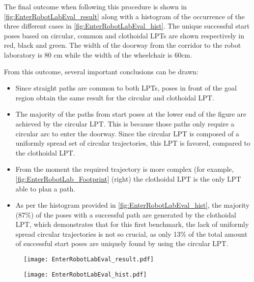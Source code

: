 \vspace{1em}

The final outcome when following this procedure is shown in \cref{fig:EnterRobotLabEval_result} along with a histogram of the occurrence of the three different cases in \cref{fig:EnterRobotLabEval_hist}. The unique successful start poses based on circular, common and clothoidal LPTs are shown respectively in red, black and green. The width of the doorway from the corridor to the robot laboratory is 80 cm while the width of the wheelchair is 60cm.

\newpage

From this outcome, several important conclusions can be drawn:
\begin{itemize}
\item Since straight paths are common to both LPTs, poses in front of the goal region obtain the same result for the circular and clothoidal LPT.
\item The majority of the paths from start poses at the lower end of the figure are achieved by the circular LPT. This is because those paths only require a circular arc to enter the doorway. Since the circular LPT is composed of a uniformly spread set of circular trajectories, this LPT is favored, compared to the clothoidal LPT.
\item From the moment the required trajectory is more complex (for example, \cref{fig:EnterRobotLab_Footprint} (right) the clothoidal LPT is the only LPT able to plan a path.
\item As per the histogram provided in \cref{fig:EnterRobotLabEval_hist}, the majority (87\%) of the poses with a successful path are generated by the clothoidal LPT, which demonstrates that for this first benchmark, the lack of uniformly spread circular trajectories is not so crucial, as only 13\% of the total amount of successful start poses are uniquely found by using the circular LPT.
\end{itemize}

\begin{figure}[!htbp]
	\centering
    \texttt{[image: EnterRobotLabEval\_result.pdf]}
\end{figure}

\begin{figure}[!htbp]
	\centering
    \texttt{[image: EnterRobotLabEval\_hist.pdf]}
\end{figure}

